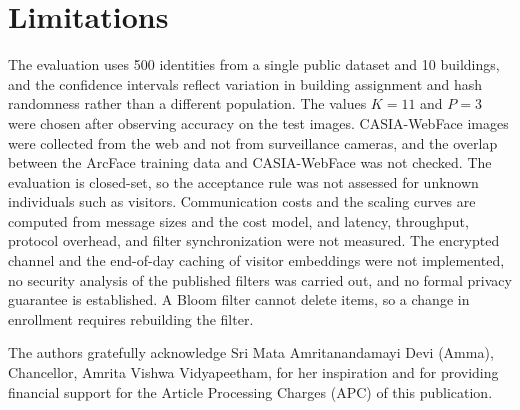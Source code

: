 \documentclass[pdflatex,sn-mathphys-num]{sn-jnl}%
\theoremstyle{thmstyleone}%
\theoremstyle{thmstyletwo}%
\theoremstyle{thmstylethree}%
\begin{document}

\section{Limitations}
\label{sec:limitations}

The evaluation uses 500 identities from a single public dataset and 10 buildings, and the confidence intervals reflect variation in building assignment and hash randomness rather than a different population. The values $K=11$ and $P=3$ were chosen after observing accuracy on the test images. CASIA-WebFace images were collected from the web and not from surveillance cameras, and the overlap between the ArcFace training data and CASIA-WebFace was not checked. The evaluation is closed-set, so the acceptance rule was not assessed for unknown individuals such as visitors. Communication costs and the scaling curves are computed from message sizes and the cost model, and latency, throughput, protocol overhead, and filter synchronization were not measured. The encrypted channel and the end-of-day caching of visitor embeddings were not implemented, no security analysis of the published filters was carried out, and no formal privacy guarantee is established. A Bloom filter cannot delete items, so a change in enrollment requires rebuilding the filter.


The authors gratefully acknowledge Sri Mata Amritanandamayi Devi (Amma), Chancellor, Amrita Vishwa Vidyapeetham, for her inspiration and for providing financial support for the Article Processing Charges (APC) of this publication.

\end{document}
